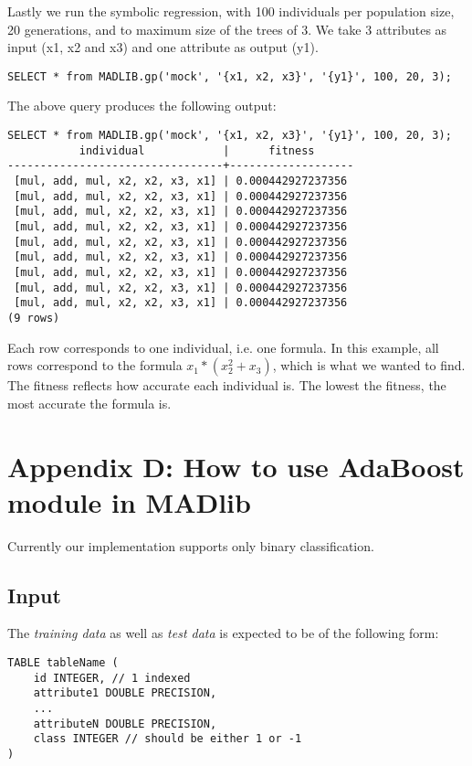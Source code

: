 {\raggedleft Lastly we run the symbolic regression, with 100 individuals per population size, 20 generations, and to maximum size of the trees of 3. We take 3 attributes as input (x1, x2 and x3) and one attribute as output (y1).}
\begin{verbatim}
SELECT * from MADLIB.gp('mock', '{x1, x2, x3}', '{y1}', 100, 20, 3);
\end{verbatim}

{\raggedleft The above query produces the following output:}
\begin{verbatim}
SELECT * from MADLIB.gp('mock', '{x1, x2, x3}', '{y1}', 100, 20, 3);
           individual            |      fitness
---------------------------------+-------------------
 [mul, add, mul, x2, x2, x3, x1] | 0.000442927237356
 [mul, add, mul, x2, x2, x3, x1] | 0.000442927237356
 [mul, add, mul, x2, x2, x3, x1] | 0.000442927237356
 [mul, add, mul, x2, x2, x3, x1] | 0.000442927237356
 [mul, add, mul, x2, x2, x3, x1] | 0.000442927237356
 [mul, add, mul, x2, x2, x3, x1] | 0.000442927237356
 [mul, add, mul, x2, x2, x3, x1] | 0.000442927237356
 [mul, add, mul, x2, x2, x3, x1] | 0.000442927237356
 [mul, add, mul, x2, x2, x3, x1] | 0.000442927237356
(9 rows)
\end{verbatim}

Each row corresponds to one individual, i.e. one formula. In this example, all rows correspond to the formula $x_1*(x_2^2+x_3)$, which is what we wanted to find. The fitness reflects how accurate each individual is. The lowest the fitness, the most accurate the formula is.


\section*{Appendix D: How to use AdaBoost module in MADlib}
Currently our implementation supports only binary classification.

\subsection*{Input}
The {\itshape training data} as well as {\itshape test data} is expected to be of the following form:

\begin{verbatim}
TABLE tableName (
    id INTEGER, // 1 indexed
    attribute1 DOUBLE PRECISION,
    ...
    attributeN DOUBLE PRECISION,
    class INTEGER // should be either 1 or -1
)
\end{verbatim}

